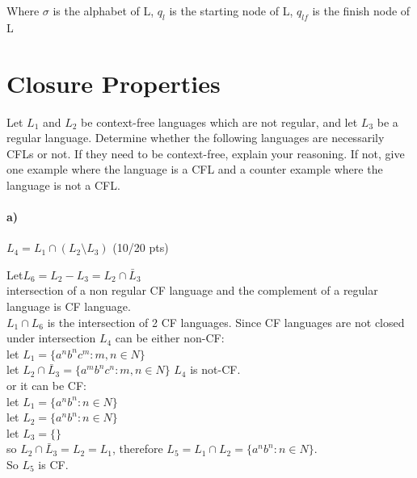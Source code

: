 \documentclass[a4paper,12pt]{article}
\begin{document}
\begin{tcolorbox}
Where $\sigma$ is the alphabet of L, $q_l$ is the starting node of L, $q_{lf}$ is the finish node of L



\end{tcolorbox}






\newpage
\section{Closure Properties \hfill {}}

Let $L_1$ and $L_2$ be context-free languages which are not regular, and let $L_3$ be a regular language. Determine whether the following languages are necessarily CFLs or not. If they need to be context-free, explain your reasoning. If not, give one example where the language is a CFL and a counter example where the language is not a CFL. \\

\paragraph{a)} $L_4 = L_1 \cap (L_2 \setminus L_3)$ \hfill \small{(10/20 pts)} \\

\begin{tcolorbox}
Let$L_6=L_2 - L_3=L_2 \cap \bar L_3$ \\ intersection of a non regular CF language and the complement of a regular language is CF language. \\
$L_1 \cap L_6$ is the intersection of 2 CF languages. Since CF languages are not closed under intersection $L_4$ can be either non-CF:\\
let $L_1=\{ a^nb^nc^m:m,n \in N \}$\\
let $L_2 \cap \bar L_3 = \{ a^mb^nc^n: m,n\in N \}$
$L_4$ is not-CF.
\\
or it can be CF: \\
let $L_1=\{ a^nb^n:n \in N\}$\\
let $L_2=\{ a^nb^n:n \in N\}$\\
let $L_3=\{ \}$\\
so  $L_2 \cap \bar L_3=L_2=L_1$, therefore $L_5=L_1 \cap L_2=\{ a^nb^n:n \in N\} $. \\
So $L_5$ is CF.

\end{tcolorbox}
\end{document}

